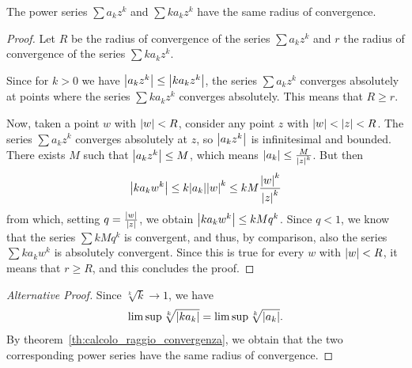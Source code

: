 \begin{theorem}
\label{th:raggio_serie_derivate}
The power series $\sum a_k z^k$ and $\sum k a_k z^k$ have
the same radius of convergence.
\end{theorem}
%
\begin{proof}
  Let $R$ be the radius of convergence of the series $\sum a_k z^k$ 
  and $r$ the radius of convergence of the series $\sum k a_k z^k$.
  
  Since for $k>0$ we have ${\left|a_k z^k\right|} \le {\left|k a_k z^k\right|}$,
  the series $\sum a_k z^k$ converges absolutely at points 
  where the series $\sum k a_k z^k$ converges absolutely.
  This means that $R\ge r$.

  Now, taken a point $w$ with ${\left|w\right|}<R$, consider any
  point $z$ with ${\left|w\right|}<{\left|z\right|}<R$.
  The series $\sum a_k z^k$ converges absolutely at $z$, 
  so ${\left|a_k z^k\right|}$ is infinitesimal and bounded.
  There exists $M$ such that ${\left|a_k z^k\right|}\le M$, 
  which means ${\left|a_k\right|} \le \frac{M}{{\left|z\right|}^k}$.
  But then 
  \[
    {\left|k a_k w^k\right|} 
    \le k {\left|a_k\right|} {\left|w\right|}^k
    \le k M \frac{{\left|w\right|}^k}{{\left|z\right|}^k}
  \]
  from which, setting $q=\frac{{\left|w\right|}}{{\left|z\right|}}$, we obtain 
  ${\left|k a_k w^k\right|} \le k M q^k$. 
  Since $q<1$, we know that the series $\sum k M q^k$ 
  is convergent, and thus, by comparison, also the 
  series $\sum k a_k w^k$ is absolutely convergent.
  Since this is true for every $w$ with ${\left|w\right|}<R$,
  it means that $r\ge R$, and this concludes the proof.
\end{proof}
%
\begin{proof}[Alternative Proof]
Since $\sqrt[k]{k}\to 1$, we have
\[
  \limsup \sqrt[k]{{\left|k a_k\right|}} = \limsup \sqrt[k]{{\left|a_k\right|}}.
\]
By theorem~\ref{th:calcolo_raggio_convergenza}, we obtain
that the two corresponding power series have the same radius of convergence.
\end{proof}

